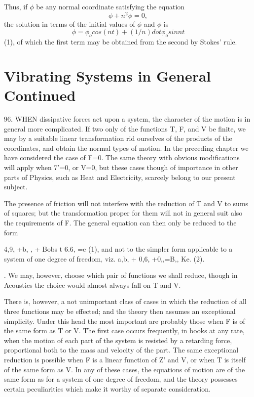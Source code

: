 Thus, if \(\phi\) be any normal coordinate satisfying the equation
\[ \phi + n^2 \phi = 0, \]
the solution in terms of the initial values of \(\phi\) and \(\dot{\phi}\) is
\[ \phi = \phi_o cos(nt) + (1/n) dot \phi_o sin nt \]
(1), of which the first term
may be obtained from the second by Stokes' rule.

\chapter{Vibrating Systems in General Continued}
\label{vibrating-systems-in-general-continued}

96. WHEN dissipative forces act upon a system, the character of the motion is
in general more complicated. If two only of the functions T, F, and V be
finite, we may by a suitable linear transformation rid ourselves of the
products of the coordinates, and obtain the normal types of motion. In the
preceding chapter we have considered the case of F=0. The same theory with
obvious modifications will apply when 7'=0, or V=0, but these cases though of
importance in other parts of Physics, such as Heat and Electricity, scarcely
belong to our present subject.

The presence of friction will not interfere with the reduction of T and V to
sums of squares; but the transformation proper for them will not in general
suit also the requirements of F. The general equation can then only be reduced
to the form

4,9, +b, , + Bobs t 6.6, =e (1), and not to the simpler form applicable to a
system of one degree of freedom, viz. a,b, + 0,6, +0,,=B,, Ke. (2).

. We may, however, choose which pair of functions we shall reduce, though in
Acoustics the choice would almost always fall on T and V.

There is, however, a not unimportant class of cases in which the reduction
of all three functions may be effected; and the theory then assumes an
exceptional simplicity. Under this head the most important are probably those
when F is of the same form as T or V. The first case occurs frequently, in
books at any rate, when the motion of each part of the system is resisted by a
retarding force, proportional both to the mass and velocity of the part. The
same exceptional reduction is possible when F is a linear function of Z' and V,
or when T is itself of the same form as V. In any of these cases, the equations
of motion are of the same form as for a system of one degree of freedom, and
the theory possesses certain peculiarities which make it worthy of separate
consideration.

